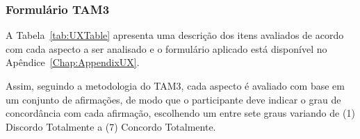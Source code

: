 \subsubsection{Formulário TAM3}\label{sub:TAM3}

A Tabela~\ref{tab:UXTable} apresenta uma descrição dos itens avaliados de acordo com cada aspecto a ser analisado e o formulário aplicado está disponível no Apêndice~\ref{Chap:AppendixUX}. 

Assim, seguindo a metodologia do TAM3, cada aspecto é avaliado com base em um conjunto de afirmações, de modo que o participante deve indicar o grau de concordância com cada afirmação, escolhendo um entre sete graus variando de (1) Discordo Totalmente a (7) Concordo Totalmente.

